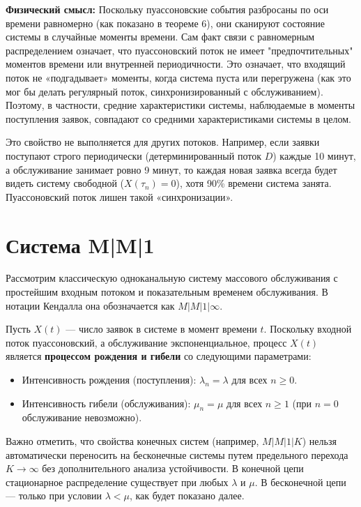 \textbf{Физический смысл:}
Поскольку пуассоновские события разбросаны по оси времени равномерно (как показано в теореме 6), они сканируют состояние системы в случайные моменты времени. Сам факт связи с равномерным распределением означает, что пуассоновский поток не имеет "предпочтительных" моментов времени или внутренней периодичности. Это означает, что входящий поток не «подгадывает» моменты, когда система пуста или перегружена (как это мог бы делать регулярный поток, синхронизированный с обслуживанием). Поэтому, в частности, средние характеристики системы, наблюдаемые в моменты поступления заявок, совпадают со средними характеристиками системы в целом.

\begin{note}
Это свойство не выполняется для других потоков. Например, если заявки поступают строго периодически (детерминированный поток $D$) каждые 10 минут, а обслуживание занимает ровно 9 минут, то каждая новая заявка всегда будет видеть систему свободной ($X(\tau_n) = 0$), хотя 90\% времени система занята. Пуассоновский поток лишен такой «синхронизации».
\end{note}

\section{Система M|M|1}

Рассмотрим классическую одноканальную систему массового обслуживания с простейшим входным потоком и показательным временем обслуживания. В нотации Кендалла она обозначается как $M|M|1|\infty$.

\begin{statement}
Пусть $X(t)$ — число заявок в системе в момент времени $t$. Поскольку входной поток пуассоновский, а обслуживание экспоненциальное, процесс $X(t)$ является \textbf{процессом рождения и гибели} со следующими параметрами:
\begin{itemize}
    \item Интенсивность рождения (поступления): $\lambda_n = \lambda$ для всех $n \ge 0$.
    \item Интенсивность гибели (обслуживания): $\mu_n = \mu$ для всех $n \ge 1$ (при $n=0$ обслуживание невозможно).
\end{itemize}
\end{statement}

\begin{note}
Важно отметить, что свойства конечных систем (например, $M|M|1|K$) нельзя автоматически переносить на бесконечные системы путем предельного перехода $K \to \infty$ без дополнительного анализа устойчивости. В конечной цепи стационарное распределение существует при любых $\lambda$ и $\mu$. В бесконечной цепи — только при условии $\lambda < \mu$, как будет показано далее.
\end{note}

